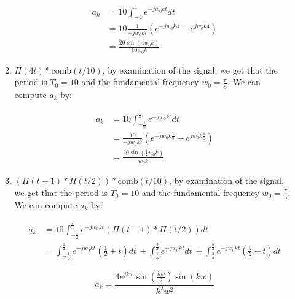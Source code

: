 \documentclass[]{article}
\begin{document}
\begin{enumerate}
\begin{enumerate}
    \begin{align*}
        a_k &= 10\int_{-4}^{4} e^{-jw_0 k t} dt \\
            &= 10 \frac{1}{-jw_0kt} \left(  e^{-jw_0k4}- e^{jw_0k4}\right) \\
            &= \boxed{ \frac{20\sin(4w_0 k)}{10 w_0 k} }
    \end{align*}
  \item
    \(\Pi(4t) * \text{comb}(t / 10)\), by examination of the signal, we
    get that the period is \(T_0 = 10\) and the fundamental frequency
    \(\boxed{w_0 = \frac{\pi}{5}}\). We can compute \(a_k\) by:

    \begin{align*}
        a_k &= 10 \int_{-\frac{1}{8}}^{\frac{1}{8}} e^{-jw_0 k t} dt \\
            &= \frac{10}{-jw_0kt } \left(
                e^{-jw_0k\frac{1}{8}}- e^{jw_0k\frac{1}{8}}
            \right) \\
        &= \boxed{ \frac{20\sin(\frac{1}{8}w_0 k)}{w_0 k} }
    \end{align*}
  \item
    \((\Pi(t - 1) * \Pi(t / 2)) * \text{comb}(t / 10)\), by examination
    of the signal, we get that the period is \(T_0 = 10\) and the
    fundamental frequency \(\boxed{w_0 = \frac{\pi}{5}}\). We can
    compute \(a_k\) by:

    \begin{align*}
        a_k &= 10 \int_{-\frac{1}{2}}^{\frac{5}{2}} e^{-jw_0 k t} (\Pi(t - 1) * \Pi(t / 2)) dt \\
            &= \int_{-\frac{1}{2}}^{\frac{1}{2}} e^{-jw_0 k t} (\frac{1}{2} + t)dt \, +
        \int_{\frac{1}{2}}^{\frac{3}{2}} e^{-jw_0 k t} dt\, +
        \int_{\frac{3}{2}}^{\frac{5}{2}} e^{-jw_0 k t}(\frac{5}{2} - t) dt
    \end{align*}

    \[
        \boxed{a_k = \frac{4 e^{j k w} \sin \left(\frac{k w}{2}\right) \sin (k w)}{k^2 w^2}}
    \]
  \end{enumerate}
\end{enumerate}
\end{document}
